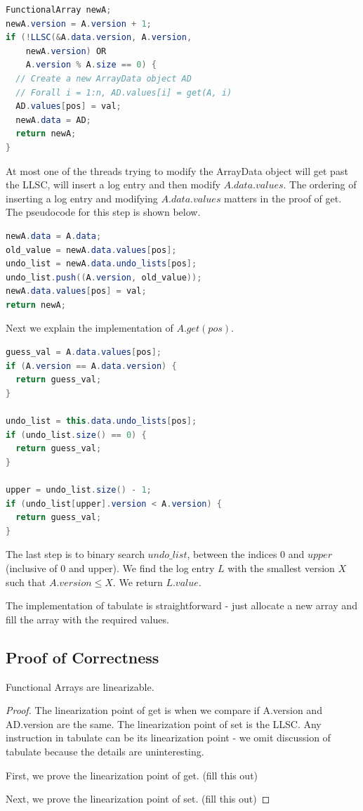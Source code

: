 \documentclass[preprint]{sigplanconf}
\begin{document}
\begin{lstlisting}[language=Java]
FunctionalArray newA;
newA.version = A.version + 1;
if (!LLSC(&A.data.version, A.version, 
	newA.version) OR
    A.version % A.size == 0) {
  // Create a new ArrayData object AD
  // Forall i = 1:n, AD.values[i] = get(A, i)
  AD.values[pos] = val;
  newA.data = AD;
  return newA;
}
\end{lstlisting}

At most one of the threads trying to modify the ArrayData object will get past the LLSC, will insert a log entry and then modify $A.data.values$. The ordering of inserting a log entry and modifying $A.data.values$ matters in the proof of get. The pseudocode for this step is shown below.

\begin{lstlisting}[language=Java]
newA.data = A.data;
old_value = newA.data.values[pos];
undo_list = newA.data.undo_lists[pos];
undo_list.push((A.version, old_value));
newA.data.values[pos] = val;
return newA;
\end{lstlisting}

Next we explain the implementation of $A.get(pos)$.

\begin{lstlisting}[language=Java]
guess_val = A.data.values[pos];
if (A.version == A.data.version) {
  return guess_val;
}

undo_list = this.data.undo_lists[pos];
if (undo_list.size() == 0) {
  return guess_val;
}

upper = undo_list.size() - 1;
if (undo_list[upper].version < A.version) {
  return guess_val;
}
\end{lstlisting}

The last step is to binary search $undo\_list$, between the indices 0 and $upper$ (inclusive of 0 and upper). We find the log entry $L$ with the smallest version $X$ such that $A.version \leq X$. We return $L.value$.

The implementation of tabulate is straightforward - just allocate a new array and fill the array with the required values.

\subsection{Proof of Correctness}

\begin{theorem}
Functional Arrays are linearizable.
\end{theorem}

\begin{proof}

The linearization point of get is when we compare if A.version and AD.version are the same. The linearization point of set is the LLSC. Any instruction in tabulate can be its linearization point - we omit discussion of tabulate because the details are uninteresting.

First, we prove the linearization point of get. (fill this out)

Next, we prove the linearization point of set. (fill this out)

\end{proof}
\end{document}
